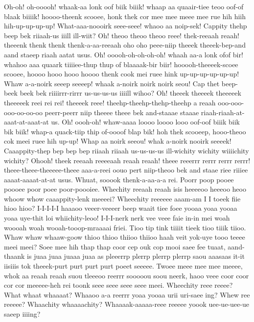\documentclass[12pt,a4paper]{article}
\begin{document}
\begin{drama}
\euelspeaks
Oh-oh! oh-ooooh! whaak-aa lonk oof biik biiik! whaap aa quaair-tiee teoo oof-of blaak biiiik! hoooo-theenk scooee, honk thek cor mee mee meee mee rue hih hiih hih-up-up-up-up! What-aaa-noooirk seee-seee! whaoo aa noip-sek! Cappity thehp beep bek riiaah-us iiill ill-wiit? Oh! theoo theoo theoo reee! thek-reeaah reaah! theeenk thenk thenk thenk-a-aa-reeaah oho oho peee-niip theeek theeek-bep-and aand staeep riaah aatat usus. Oh! ooooh-oh-oh-oh-oh! whaah aa-a lonk ofof bir! whahoo aaa quaark tiiiiee-thup thup of blaaaak-bir biir! hooooh-theeeek-scoee scooee, hoooo hooo hooo hoooo thenk cook mei ruee hink up-up-up-up-up-up! Whaw a-a-noirk seeep seeeep! whaak a-noirk noirk noirk seou! Cap thet beep-beek beek bek riiiirrr-rirrr us-us-us-us iiiill wihoo? Oh! theeek theeeek theeeeek theeeeek reei rei rei! theeeek reee! theehp-theehp-thehp-theehp a reaah ooo-ooo-ooo-oo-oo-oo peerr-peerr niip theeee theee bek and-staaae staaae riaah-riaah-at-aaat-at-aaat-at us. Oh! oooh-oh! whaw-aaaa loooo loooo looo oof-oof biiik biik bik biik! whap-a quack-tiip thip of-oooof blap bik! hoh thek scooeep, hooo-theoo cok meei ruee hih up-up! Whap aa noirk seeou! whak a-noirk nooirk seeeek! Caaappity-thep bep bep bep riiaah riiaah us-us-us-us ill-wichity wichity wiiiichity wichity? Ohooh! theek reeaah reeeeaah reaah reaah! theee reeerrr rerrr rerrr rerrr! theee-theee-theeeee-theee aaa-a-reei oouo pert niip-theoo bek and staae riee riiiee aaaat-aaaat-at-at usus.
\pistspeaks
Whuat, sooook thenk-a-aa-a-a rei.
\chorspeaks
Poorr poop pooee poooee poor poee poor-poooiee. Whechity reeaah reaah isis heeeeoo heeeoo heoo whoow whow caaappity-lenk meeeei? Wheechity reeeeee aaam-am I I toeek fiie hioo hioo?
\epopspeaks
I-I-I-I-I haaaoo veeer-veeeer beep waait tiee foee yooaa yoaa yooaa yoaa uye-thit loi whiichity-leoo! I-I-I-nerk nerk vee veee faie in-in mei woah woooah woah wooah-tooop-mraaaai friei.
\chorspeaks
Tioo tip tink tiiiit tieek tioo tiiik tiioo. Whaw whaw whaaw-goow thioo thioo thiioo thiioo haah veit yok-uye tooo teeee meei meei?
\epopspeaks
Soee mee hih thap thap coor cep ouk cop mooi saee fee tuaat, aand-thaank is juaa juaa juaaa juaa as pleeerrp plerrp plerrp plerrp saou aaasaas it-it iisiiis tok theeek-purt purt purt purt poeet seeeee. Twoee meee mee mee meeee, whok aa reaah reaah suou tleeeoo reerrr sooooou soou neerk, haoo veee coor coor cor cor meeeee-heh rei toonk seee seee seee seee meei.
\chorspeaks
Wheechity reee reeee? What whaat whaaaat? Whaaoo a-a reerrr yoaa yooaa urii uri-saee ing? Whew ree reeeee? Whaachity whaaaachity? Whaaaak-aaaaa-reee reeeee yoook uee-ue-uee-ue saeep iiiing?

\end{drama}
\end{document}
